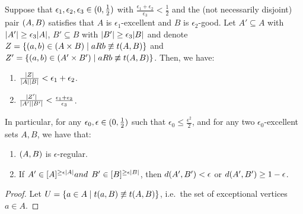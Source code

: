         \begin{lemma} \label{lem:excellence_implies_regularity}
            Suppose that $\epsilon_1, \epsilon_2, \epsilon_3 \in ( 0, \frac{1}{2} )$ with
            $\frac{\epsilon_1 + \epsilon_2}{\epsilon_3} < \frac{1}{2}$ and the (not necessarily disjoint) pair $( A,B )$ satisfies that
            $A$ is $\epsilon_1$-excellent and $B$ is $\epsilon_2$-good.
            Let $A' \subseteq A$ with $| A' | \geq \epsilon_3 | A |$,
            $B' \subseteq B$ with $| B' | \geq \epsilon_3 | B |$ and
            denote $Z = \{ ( a,b ) \in ( A \times B ) \mid a R b \not\equiv t( A,B ) \}$ and
            $Z' = \{ ( a,b ) \in ( A' \times B' ) \mid a R b \not\equiv t( A,B ) \}$.
            Then, we have:
            \begin{enumerate}[label={\Roman*}., ref={\Roman*}, font=\rmfamily]
                \item \label{itm:excellence_implies_regularity.1} $\frac{| Z |}{{| A | | B |}} < \epsilon_1 + \epsilon_2$.
                \item \label{itm:excellence_implies_regularity.2} $\frac{| Z' |}{| A' | | B' |} <
                    \frac{\epsilon_1 + \epsilon_2}{\epsilon_3}$.
            \end{enumerate}
            In particular, for any $\epsilon_0, \epsilon \in ( 0, \frac{1}{2} )$ such that $\epsilon_0 \leq \frac{\epsilon^2}{2}$,
            and for any two $\epsilon_0$-excellent sets $A, B$, we have that:
            \begin{enumerate}[label={\roman*}., ref={\roman*}, font=\rmfamily]
                \item \label{itm:excellence_implies_regularity.a} $( A,B )$ is $\epsilon$-regular.
                \item \label{itm:excellence_implies_regularity.b} If $A' \in [ A ]^{\geq \epsilon | A |} and $
                    $B' \in [ B ]^{\geq \epsilon | B |}$, then $d ( A',B' ) < \epsilon$ or
                    $d ( A',B' ) \geq 1 - \epsilon$.
            \end{enumerate}
            \begin{proof}
                Let $U = \{ a \in A \mid t(a,B) \not\equiv t(A,B) \}$, i.e.~the set
                of exceptional vertices $a \in A$.

\end{proof}
\end{lemma}
